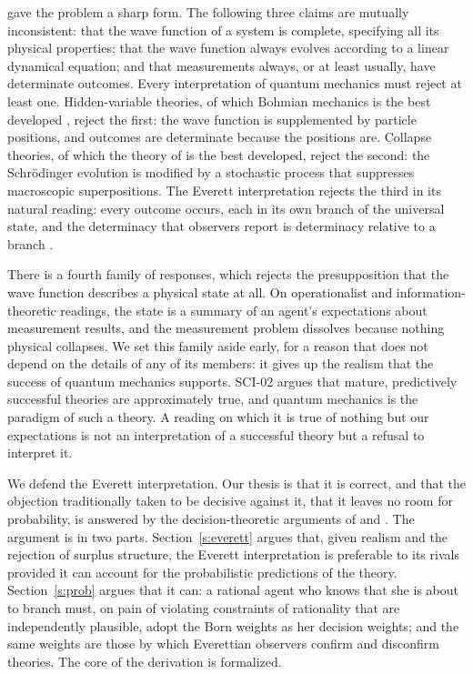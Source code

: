 \documentclass{situationist-preprint}
\begin{document}
\citet{Maudlin1995} gave the problem a sharp form. The following three claims are mutually inconsistent: that the wave function of a system is complete, specifying all its physical properties; that the wave function always evolves according to a linear dynamical equation; and that measurements always, or at least usually, have determinate outcomes. Every interpretation of quantum mechanics must reject at least one. Hidden-variable theories, of which Bohmian mechanics is the best developed \citep{Bohm1952}, reject the first: the wave function is supplemented by particle positions, and outcomes are determinate because the positions are. Collapse theories, of which the theory of \citet{GRW1986} is the best developed, reject the second: the Schrödinger evolution is modified by a stochastic process that suppresses macroscopic superpositions. The Everett interpretation rejects the third in its natural reading: every outcome occurs, each in its own branch of the universal state, and the determinacy that observers report is determinacy relative to a branch \citep{Everett1957}.

There is a fourth family of responses, which rejects the presupposition that the wave function describes a physical state at all. On operationalist and information-theoretic readings, the state is a summary of an agent's expectations about measurement results, and the measurement problem dissolves because nothing physical collapses. We set this family aside early, for a reason that does not depend on the details of any of its members: it gives up the realism that the success of quantum mechanics supports. SCI-02 argues that mature, predictively successful theories are approximately true, and quantum mechanics is the paradigm of such a theory. A reading on which it is true of nothing but our expectations is not an interpretation of a successful theory but a refusal to interpret it.

We defend the Everett interpretation. Our thesis is that it is correct, and that the objection traditionally taken to be decisive against it, that it leaves no room for probability, is answered by the decision-theoretic arguments of \citet{Deutsch1999} and \citet{Wallace2003b,Wallace2007,Wallace2012}. The argument is in two parts. Section~\ref{s:everett} argues that, given realism and the rejection of surplus structure, the Everett interpretation is preferable to its rivals provided it can account for the probabilistic predictions of the theory. Section~\ref{s:prob} argues that it can: a rational agent who knows that she is about to branch must, on pain of violating constraints of rationality that are independently plausible, adopt the Born weights as her decision weights; and the same weights are those by which Everettian observers confirm and disconfirm theories. The core of the derivation is formalized.
\end{document}
